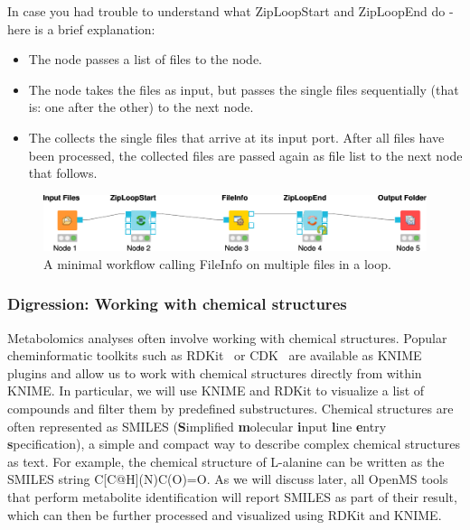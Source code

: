 In case you had trouble to understand what ZipLoopStart and ZipLoopEnd do - here is a brief explanation:
\begin{itemize}
\item
The   node passes a list of files to the  node.
\item
The  node takes the files as input, but passes the single files sequentially (that is: one after the other) to the next node. 
\item
The  collects the single files that arrive at its input port. After all files have been processed, the collected files are passed again as file list to the next node that follows.
\end{itemize}

\begin{figure}
\centering
\includegraphics[width=\textwidth]{graphics/knime_setup/Minimal_FileInfoLoop}
\caption{A minimal workflow calling FileInfo on multiple files in a loop.}
\label{fig:knime_minimal_loop}
\end{figure}

\subsubsection{Digression: Working with chemical structures}
Metabolomics analyses often involve working with chemical structures. Popular cheminformatic toolkits such as RDKit~\cite{rdkit} or CDK~\cite{cdk} are available as KNIME plugins and allow us to work with chemical structures directly from within KNIME. In particular, we will use KNIME and RDKit to visualize a list of compounds and filter them by predefined substructures. Chemical structures are often represented as SMILES (\textbf{S}implified \textbf{m}olecular \textbf{i}nput \textbf{l}ine \textbf{e}ntry \textbf{s}pecification), a simple and compact way to describe complex chemical structures as text. For example, the chemical structure of L-alanine can be written as the SMILES string C[C@H](N)C(O)=O. As we will discuss later, all OpenMS tools that perform metabolite identification will report SMILES as part of their result, which can then be further processed and visualized using RDKit and KNIME.

